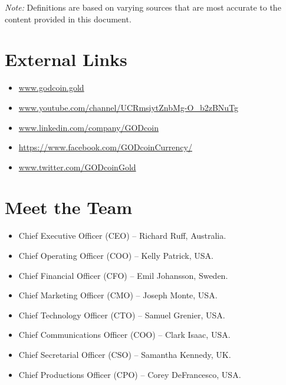 \documentclass[12pt,a4paper]{article}
\begin{document}
  \newpage
  \printnoidxglossaries{}

  \textit{Note:} Definitions are based on varying sources that are most accurate
  to the content provided in this document.
  \newpage

  \section*{External Links}
  \begin{itemize}
    \item{\url{www.godcoin.gold}}
    \item{\url{www.youtube.com/channel/UCRmsiytZnbMg-O_b2zBNuTg}}
    \item{\url{www.linkedin.com/company/GODcoin}}
    \item{\url{https://www.facebook.com/GODcoinCurrency/}}
    \item{\url{www.twitter.com/GODcoinGold}}
  \end{itemize}
  \section*{Meet the Team}
  \begin{itemize}
    \item{Chief Executive Officer (CEO) – Richard Ruff, Australia.}
    \item{Chief Operating Officer (COO) – Kelly Patrick, USA.}
    \item{Chief Financial Officer (CFO) – Emil Johansson, Sweden.}
    \item{Chief Marketing Officer (CMO) – Joseph Monte, USA.}
    \item{Chief Technology Officer (CTO) – Samuel Grenier, USA.}
    \item{Chief Communications Officer (COO) – Clark Isaac, USA.}
    \item{Chief Secretarial Officer (CSO) – Samantha Kennedy, UK.}
    \item{Chief Productions Officer (CPO) – Corey DeFrancesco, USA.}
  \end{itemize}
  \printbibliography{}
\end{document}

